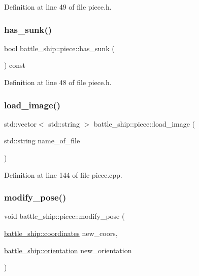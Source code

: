 Definition at line 49 of file piece.\+h.

\mbox{\label{classbattle__ship_1_1piece_a54f1726ec088b6bd8d4d33c07a78548f}} 
\subsubsection{\texorpdfstring{has\+\_\+sunk()}{has\_sunk()}}
{\footnotesize\ttfamily bool battle\+\_\+ship\+::piece\+::has\+\_\+sunk (\begin{DoxyParamCaption}{ }\end{DoxyParamCaption}) const\hspace{0.3cm}{\ttfamily [inline]}}



Definition at line 48 of file piece.\+h.

\mbox{\label{classbattle__ship_1_1piece_a32b199cb8c7c77cf2caadeabea5dd362}} 
\subsubsection{\texorpdfstring{load\+\_\+image()}{load\_image()}}
{\footnotesize\ttfamily std\+::vector$<$ std\+::string $>$ battle\+\_\+ship\+::piece\+::load\+\_\+image (\begin{DoxyParamCaption}\item[{std\+::string}]{name\+\_\+of\+\_\+file }\end{DoxyParamCaption})}



Definition at line 144 of file piece.\+cpp.

\mbox{\label{classbattle__ship_1_1piece_abfab329108cd431413b3136c3aafec87}} 
\subsubsection{\texorpdfstring{modify\+\_\+pose()}{modify\_pose()}}
{\footnotesize\ttfamily void battle\+\_\+ship\+::piece\+::modify\+\_\+pose (\begin{DoxyParamCaption}\item[{\hyperlink{structbattle__ship_1_1coordinates}{battle\+\_\+ship\+::coordinates}}]{new\+\_\+coors,  }\item[{\hyperlink{namespacebattle__ship_aed87488f0a73f0d0679fe343fb61c784}{battle\+\_\+ship\+::orientation}}]{new\+\_\+orientation }\end{DoxyParamCaption})}



